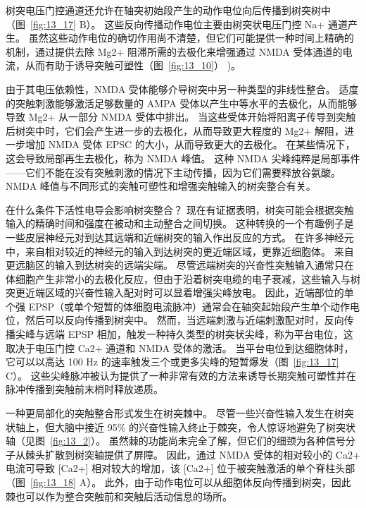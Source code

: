 树突电压门控通道还允许在轴突初始段产生的动作电位向后传播到树突树中（图~\ref{fig:13_17} B）。
这些反向传播动作电位主要由树突状电压门控 Na+ 通道产生。
虽然这些动作电位的确切作用尚不清楚，但它们可能提供一种时间上精确的机制，通过提供去除 Mg2+ 阻滞所需的去极化来增强通过 NMDA 受体通道的电流，从而有助于诱导突触可塑性（图~\ref{fig:13_10}） )。


由于其电压依赖性，NMDA 受体能够介导树突中另一种类型的非线性整合。
适度的突触刺激能够激活足够数量的 AMPA 受体以产生中等水平的去极化，从而能够导致 Mg2+ 从一部分 NMDA 受体中排出。
当这些受体开始将阳离子传导到突触后树突中时，它们会产生进一步的去极化，从而导致更大程度的 Mg2+ 解阻，进一步增加 NMDA 受体 EPSC 的大小，从而导致更大的去极化。
在某些情况下，这会导致局部再生去极化，称为 NMDA 峰值。
这种 NMDA 尖峰纯粹是局部事件——它们不能在没有突触刺激的情况下主动传播，因为它们需要释放谷氨酸。
NMDA 峰值与不同形式的突触可塑性和增强突触输入的树突整合有关。


在什么条件下活性电导会影响树突整合？
现在有证据表明，树突可能会根据突触输入的精确时间和强度在被动和主动整合之间切换。
这种转换的一个有趣例子是一些皮层神经元对到达其远端和近端树突的输入作出反应的方式。
在许多神经元中，来自相对较近的神经元的输入到达树突的更近端区域，更靠近细胞体。
来自更远脑区的输入到达树突的远端尖端。
尽管远端树突的兴奋性突触输入通常只在体细胞产生非常小的去极化反应，但由于沿着树突电缆的电子衰减，这些输入与树突更近端区域的兴奋性输入配对时可以显着增强尖峰放电。
因此，近端部位的单个强 EPSP（或单个短暂的体细胞电流脉冲）通常会在轴突起始段产生单个动作电位，然后可以反向传播到树突中。
然而，当远端刺激与近端刺激配对时，反向传播尖峰与远端 EPSP 相加，触发一种持久类型的树突状尖峰，称为平台电位，这取决于电压门控 Ca2+ 通道和 NMDA 受体的激活。
当平台电位到达细胞体时，它可以以高达 100 Hz 的速率触发三个或更多尖峰的短暂爆发（图~\ref{fig:13_17} C）。
这些尖峰脉冲被认为提供了一种非常有效的方法来诱导长期突触可塑性并在脉冲传播到突触前末梢时释放递质。


一种更局部化的突触整合形式发生在树突棘中。
尽管一些兴奋性输入发生在树突状轴上，但大脑中接近 95\% 的兴奋性输入终止于棘突，令人惊讶地避免了树突状轴（见图~\ref{fig:13_2}）。
虽然棘的功能尚未完全了解，但它们的细颈为各种信号分子从棘头扩散到树突轴提供了屏障。
因此，通过 NMDA 受体的相对较小的 Ca2+ 电流可导致 [Ca2+] 相对较大的增加，该 [Ca2+] 位于被突触激活的单个脊柱头部（图~\ref{fig:13_18} A）。
此外，由于动作电位可以从细胞体反向传播到树突，因此棘也可以作为整合突触前和突触后活动信息的场所。


